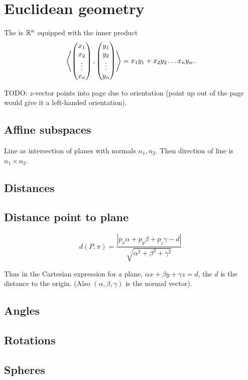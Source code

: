 \section{Euclidean geometry}
\begin{definition}
The  is $\mathbb{R}^n$ equipped with the inner product
\[ \left\langle \begin{pmatrix}
x_1 \\ x_2 \\ \vdots \\ x_n
\end{pmatrix}, \begin{pmatrix}
y_1 \\ y_2 \\ \vdots \\ y_n
\end{pmatrix} \right\rangle = x_1y_1 + x_2y_2 \ldots x_ny_n. \]
\end{definition}

TODO: $z$-vector points into page due to orientation (point up out of the page would give it a left-handed orientation).

\subsection{Affine subspaces}

Line as intersection of planes with normals $n_1,n_2$. Then direction of line is $n_1\times n_2$.

\subsection{Distances}

\subsection{Distance point to plane}
\begin{lemma}
\[ d(P,\pi) = \frac{|p_x\alpha + p_y\beta +p_z\gamma -d|}{\sqrt{\alpha^2 + \beta^2 + \gamma^2}} \]
\end{lemma}

Thus in the Cartesian expression for a plane, $\alpha x + \beta y + \gamma z = d$, the $d$ is the distance to the origin. (Also $(\alpha, \beta, \gamma)$ is the normal vector).

\subsection{Angles}

\subsection{Rotations}

\subsection{Spheres}